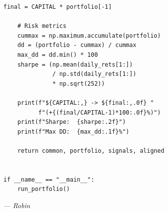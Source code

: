 \documentclass[11pt,a4paper]{article}
\begin{document}
\begin{codebox}
\begin{lstlisting}[style=python]
    final = CAPITAL * portfolio[-1]

    # Risk metrics
    cummax = np.maximum.accumulate(portfolio)
    dd = (portfolio - cummax) / cummax
    max_dd = dd.min() * 100
    sharpe = (np.mean(daily_rets[1:])
              / np.std(daily_rets[1:])
              * np.sqrt(252))

    print(f"${CAPITAL:,} -> ${final:,.0f} "
          f"(+{(final/CAPITAL-1)*100:.0f}%)")
    print(f"Sharpe:  {sharpe:.2f}")
    print(f"Max DD:  {max_dd:.1f}%")

    return common, portfolio, signals, aligned


if __name__ == "__main__":
    run_portfolio()
\end{lstlisting}
\end{codebox}

\vspace{2em}
\begin{center}
\textit{--- Robin}
\end{center}
\end{document}

